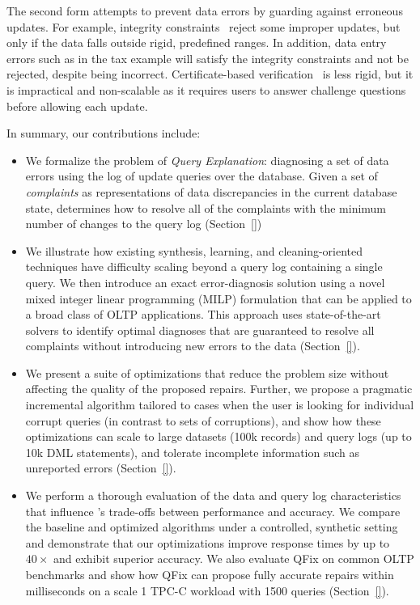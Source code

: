 The second form attempts to prevent data errors by guarding against erroneous updates.  For example, integrity constraints~\cite{Khoussainova2006} reject some improper updates, but only if the data falls outside rigid, predefined ranges.  In addition, data entry errors such as in the tax example will satisfy the integrity constraints and not be rejected, despite being incorrect.  Certificate-based verification~\cite{Chen2011} is less rigid, but it is impractical and non-scalable as it requires users to answer challenge questions before allowing each update.

In summary, our contributions include:

\begin{itemize}[leftmargin=*, topsep=0mm, itemsep=0mm]

\item We formalize the problem of {\it Query Explanation}: diagnosing a set of data errors using the log of update queries over the database.  Given a set of {\it complaints} as representations of data discrepancies in the current database state, \sys determines how to resolve all of the complaints with the minimum number of changes to the query log (Section~\ref{})

\item We illustrate how existing synthesis, learning, and cleaning-oriented techniques have difficulty scaling beyond a query log containing a single query.   We then introduce an exact error-diagnosis solution using a novel mixed integer linear programming (MILP) formulation that can be applied to a broad class of OLTP applications.  This approach uses state-of-the-art solvers to identify optimal diagnoses that are guaranteed to resolve all complaints without introducing new errors to the data (Section~\ref{}).

\item We present a suite of optimizations that reduce the problem size without affecting the quality of the proposed repairs.  Further, we propose a pragmatic incremental algorithm tailored to cases when the user is looking for individual corrupt queries (in contrast to sets of corruptions), and show how these optimizations can scale to large datasets (100k records) and query logs (up to 10k DML statements), and tolerate incomplete information such as unreported errors (Section~\ref{}).

\item We perform a thorough evaluation of the data and query log characteristics that influence \sys's trade-offs between performance and accuracy.  We compare the baseline and optimized algorithms under a controlled, synthetic setting and demonstrate that our optimizations improve response times by up to $40\times$ and exhibit superior accuracy.   We also evaluate QFix on common OLTP benchmarks and show how QFix can propose fully accurate repairs within milliseconds on a scale 1 TPC-C workload with 1500 queries (Section~\ref{}).

\end{itemize}
